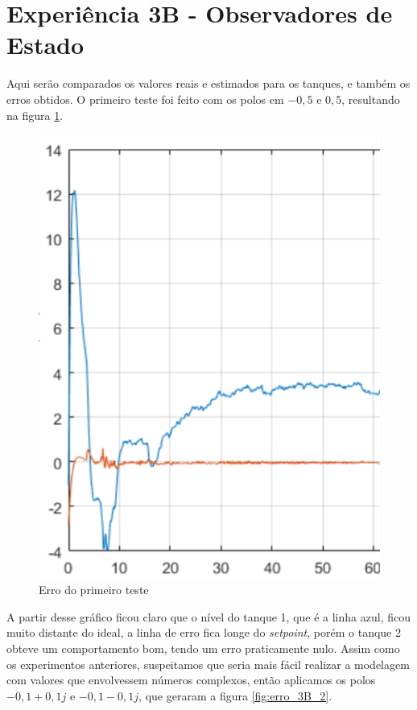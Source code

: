 \documentclass[
	12pt,				%
	openany,			%
	oneside,			%
	a4paper,			%
	english,			%
	french,				%
	spanish,			%
	brazil,				%
	]{abntex2}
\begin{document}
{\clearpage
\section{Experiência 3B - Observadores de Estado}

Aqui serão comparados os valores reais e estimados para os tanques, e também os erros obtidos. O primeiro teste foi feito com os polos em $-0,5$ e $0,5$, resultando na figura \ref{fig:erro_3B_1}.

\begin{figure}
	\begin{center}
		\includegraphics[scale=0.45]{imagens/3B_1_erro.png}
	\end{center}
	\caption{Erro do primeiro teste}
	\label{fig:erro_3B_1}
\end{figure}

A partir desse gráfico ficou claro que o nível do tanque 1, que é a linha azul, ficou muito distante do ideal, a linha de erro fica longe do \textit{setpoint}, porém o tanque 2 obteve um comportamento bom, tendo um erro praticamente nulo. Assim como os experimentos anteriores, suspeitamos que seria mais fácil realizar a modelagem com valores que envolvessem números complexos, então aplicamos os polos $-0,1 + 0,1j$ e $-0,1 - 0,1j$, que geraram a figura \ref{fig:erro_3B_2}.

}
\end{document}
